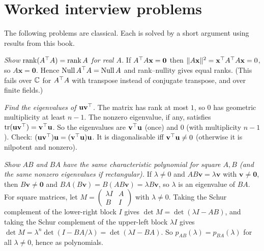 \section{Worked interview problems}

The following problems are classical. Each is solved by a short argument using results from this book.

\begin{example}
\emph{Show $\operatorname{rank}(A^{\top} A)=\operatorname{rank} A$ for real $A$.} If $A^{\top} A\mathbf{x}=\mathbf{0}$ then $\lVert A\mathbf{x}\rVert^2=\mathbf{x}^{\top} A^{\top} A\mathbf{x}=0$, so $A\mathbf{x}=\mathbf{0}$. Hence $\operatorname{Null} A^{\top} A=\operatorname{Null} A$ and rank--nullity gives equal ranks. (This fails over $\mathbb{C}$ for $A^{\top} A$ with transpose instead of conjugate transpose, and over finite fields.)
\end{example}

\begin{example}
\emph{Find the eigenvalues of $\mathbf{u}\mathbf{v}^{\top}$.} The matrix has rank at most $1$, so $0$ has geometric multiplicity at least $n-1$. The nonzero eigenvalue, if any, satisfies $\operatorname{tr}(\mathbf{u}\mathbf{v}^{\top})=\mathbf{v}^{\top}\mathbf{u}$. So the eigenvalues are $\mathbf{v}^{\top}\mathbf{u}$ (once) and $0$ (with multiplicity $n-1$). Check: $(\mathbf{u}\mathbf{v}^{\top})\mathbf{u}=(\mathbf{v}^{\top}\mathbf{u})\mathbf{u}$. It is diagonalisable iff $\mathbf{v}^{\top}\mathbf{u}\ne0$ (otherwise it is nilpotent and nonzero).
\end{example}

\begin{example}
\emph{Show $AB$ and $BA$ have the same characteristic polynomial for square $A,B$ (and the same nonzero eigenvalues if rectangular).} If $\lambda\ne0$ and $AB\mathbf{v}=\lambda\mathbf{v}$ with $\mathbf{v}\ne\mathbf{0}$, then $B\mathbf{v}\ne\mathbf{0}$ and $BA(B\mathbf{v})=B(AB\mathbf{v})=\lambda B\mathbf{v}$, so $\lambda$ is an eigenvalue of $BA$. For square matrices, let $M=\begin{pmatrix}\lambda I&A\\B&I\end{pmatrix}$ with $\lambda\ne0$. Taking the Schur complement of the lower-right block $I$ gives $\det M=\det(\lambda I-AB)$, and taking the Schur complement of the upper-left block $\lambda I$ gives $\det M=\lambda^n\det(I-BA/\lambda)=\det(\lambda I-BA)$. So $p_{AB}(\lambda)=p_{BA}(\lambda)$ for all $\lambda\ne0$, hence as polynomials.
\end{example}


